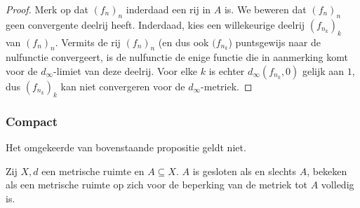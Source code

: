 \documentclass[main.tex]{subfiles}
\begin{document}
\begin{tvb}
\begin{proof}
    Merk op dat $(f_{n})_{n}$ inderdaad een rij in $A$ is.
    We beweren dat $(f_{n})_{n}$ geen convergente deelrij heeft.
    Inderdaad, kies een willekeurige deelrij $(f_{n_{k}})_{k}$ van $(f_{n})_{n}$.
    Vermits de rij $(f_{n})_{n}$ (en dus ook $(f_{n_{k}}$) puntsgewijs naar de nulfunctie convergeert, is de nulfunctie de enige functie die in aanmerking komt voor de $d_{\infty}$-limiet van deze deelrij.
    Voor elke $k$ is echter $d_{\infty}(f_{n_{k}},0)$ gelijk aan $1$, dus $(f_{n_{k}})_{k}$ kan niet convergeren voor de $d_{\infty}$-metriek.
  \end{proof}
\end{tvb}


\subsubsection{Compact}
\label{sec:compact}




\begin{tvb}
  Het omgekeerde van bovenstaande propositie geldt niet.
\end{tvb}

\begin{st}
  Zij $X,d$ een metrische ruimte en $A \subseteq X$.
  $A$ is gesloten als en slechts $A$, bekeken als een metrische ruimte op zich voor de beperking van de metriek tot $A$ volledig is.
\end{st}
\end{document}

